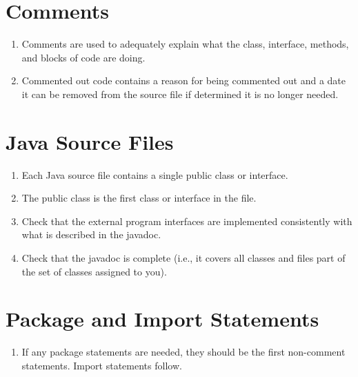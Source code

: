 \section*{Comments}\begin{enumerate}[resume]
\item Comments are used to adequately explain what the class, interface, methods, and blocks of code are doing.
\item Commented out code contains a reason for being commented out and a date it can be removed from the source file if determined it is no longer needed.
\end{enumerate}

\section*{Java Source Files}\begin{enumerate}[resume]
\item Each Java source file contains a single public class or interface.
\item The public class is the first class or interface in the file.
\item Check that the external program interfaces are implemented consistently with what is described in the javadoc.
\item Check that the javadoc is complete (i.e., it covers all classes and files part of the set of classes assigned to you).
\end{enumerate}

\section*{Package and Import Statements}\begin{enumerate}[resume]
\item If any package statements are needed, they should be the first non-comment statements. Import statements follow.
\end{enumerate}

